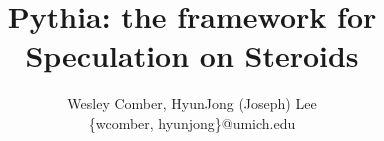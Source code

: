 \title{Pythia: the framework for Speculation on Steroids}

\author{Wesley Comber, HyunJong (Joseph) Lee \\ 
\{wcomber, hyunjong\}@umich.edu}




